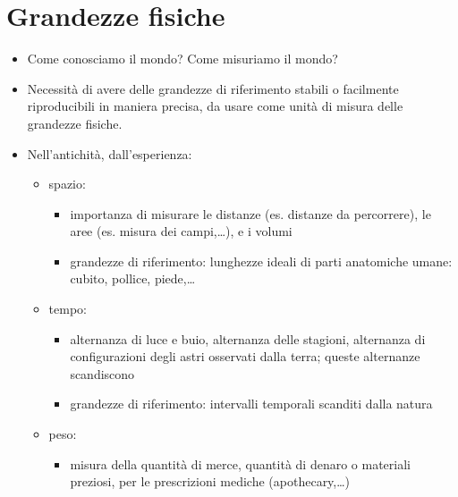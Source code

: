\documentclass[letterpaper,10pt,italian]{jupyterBook}
\begin{document}
\sphinxstepscope


\chapter{Grandezze fisiche}
\label{\detokenize{ch/intro/physical_quantities:grandezze-fisiche}}\label{\detokenize{ch/intro/physical_quantities:physics-hs-intro-physical-quantities}}\label{\detokenize{ch/intro/physical_quantities::doc}}\begin{itemize}
\item {} 
\sphinxAtStartPar
Come conosciamo il mondo? Come misuriamo il mondo?

\item {} 
\sphinxAtStartPar
Necessità di avere delle grandezze di riferimento stabili o facilmente riproducibili in maniera precisa, da usare come unità di misura delle grandezze fisiche.

\item {} 
\sphinxAtStartPar
Nell’antichità, dall’esperienza:
\begin{itemize}
\item {} 
\sphinxAtStartPar
spazio:
\begin{itemize}
\item {} 
\sphinxAtStartPar
importanza di misurare le distanze (es. distanze da percorrere), le aree (es. misura dei campi,…), e i volumi

\item {} 
\sphinxAtStartPar
grandezze di riferimento: lunghezze ideali di parti anatomiche umane: cubito, pollice, piede,…

\end{itemize}

\item {} 
\sphinxAtStartPar
tempo:
\begin{itemize}
\item {} 
\sphinxAtStartPar
alternanza di luce e buio, alternanza delle stagioni, alternanza di configurazioni degli astri osservati dalla terra; queste alternanze scandiscono

\item {} 
\sphinxAtStartPar
grandezze di riferimento: intervalli temporali scanditi dalla natura

\end{itemize}

\item {} 
\sphinxAtStartPar
peso:
\begin{itemize}
\item {} 
\sphinxAtStartPar
misura della quantità di merce, quantità di denaro o materiali preziosi, per le prescrizioni mediche (apothecary,…)


\end{itemize}
\end{itemize}
\end{itemize}
\end{document}
